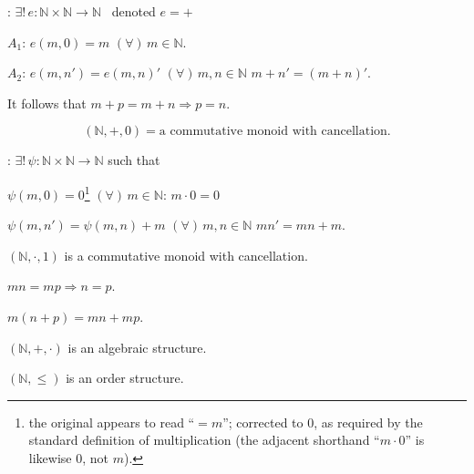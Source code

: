 \documentclass[12pt]{article}
\begin{document}
\bigskip
\noindent{}: $\exists!\, e:\mathbb{N}\times\mathbb{N}\to\mathbb{N}$ \ denoted $e=+$

\noindent $A_1$: $e(m,0)=m$ $(\forall)\,m\in\mathbb{N}$.

\noindent $A_2$: $e(m,n')=e(m,n)'$ $(\forall)\,m,n\in\mathbb{N}$ \quad $m+n'=(m+n)'$.

\bigskip
\noindent It follows that $m+p=m+n \Rightarrow p=n$.

\[
(\mathbb{N},+,0) = \text{a commutative monoid with cancellation.}
\]

\bigskip
\noindent{}: $\exists!\, \psi:\mathbb{N}\times\mathbb{N}\to\mathbb{N}$ such that

\noindent $\psi(m,0)=0$\footnote{the original appears to read ``$=m$''; corrected to $0$, as required by the standard definition of multiplication (the adjacent shorthand ``$m\cdot 0$'' is likewise $0$, not $m$).} $(\forall)\,m\in\mathbb{N}$: \quad $m\cdot 0=0$

\noindent $\psi(m,n')=\psi(m,n)+m$ $(\forall)\,m,n\in\mathbb{N}$ \quad $mn'=mn+m$.

\bigskip
\noindent $(\mathbb{N},\cdot,1)$ is a commutative monoid with cancellation.

\noindent $mn=mp \Rightarrow n=p$.

\noindent $m(n+p)=mn+mp$.

\bigskip
\noindent $(\mathbb{N},+,\cdot)$ is an algebraic structure.

\noindent $(\mathbb{N},\leq)$ is an order structure.
\end{document}
